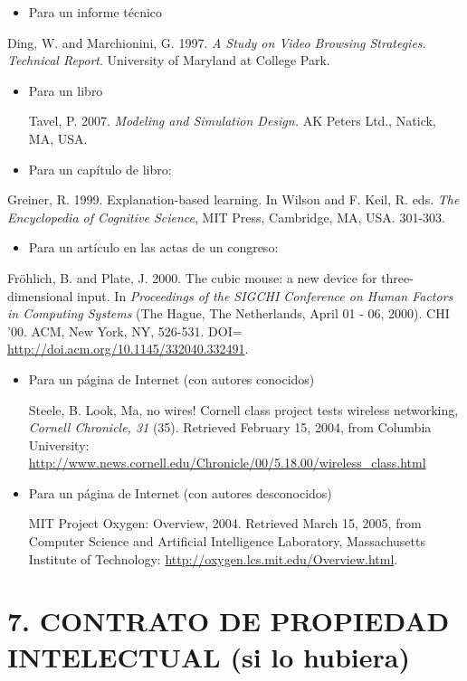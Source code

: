 \documentclass[a4paper]{article}
\newcommand\liststyleLii{%
\renewcommand\labelitemi{{\textbullet}}
\renewcommand\labelitemii{${\circ}$}
\renewcommand\labelitemiii{${\blacksquare}$}
\renewcommand\labelitemiv{{\textbullet}}
}
\newcommand\liststyleLiii{%
\renewcommand\labelitemi{{\textbullet}}
\renewcommand\labelitemii{${\circ}$}
\renewcommand\labelitemiii{${\blacksquare}$}
\renewcommand\labelitemiv{{\textbullet}}
}
\newcommand\liststyleLiv{%
\renewcommand\labelitemi{{\textbullet}}
\renewcommand\labelitemii{${\circ}$}
\renewcommand\labelitemiii{${\blacksquare}$}
\renewcommand\labelitemiv{{\textbullet}}
}
\newcommand\liststyleLv{%
\renewcommand\labelitemi{{\textbullet}}
\renewcommand\labelitemii{${\circ}$}
\renewcommand\labelitemiii{${\blacksquare}$}
\renewcommand\labelitemiv{{\textbullet}}
}
\newcommand\liststyleLvi{%
\renewcommand\labelitemi{{\textbullet}}
\renewcommand\labelitemii{${\circ}$}
\renewcommand\labelitemiii{${\blacksquare}$}
\renewcommand\labelitemiv{{\textbullet}}
}
\begin{document}
\liststyleLii
\begin{itemize}
\item Para un informe t\'ecnico
\end{itemize}
Ding, W. and Marchionini, G. 1997. \textit{A Study on Video Browsing Strategies. Technical Report}. University of
Maryland at College Park.

\liststyleLiii
\begin{itemize}
\item Para un libro

Tavel, P. 2007. \textit{Modeling and Simulation Design.} AK Peters Ltd., Natick, MA, USA.
\end{itemize}
\liststyleLiv
\begin{itemize}
\item Para un cap\'itulo de libro:
\end{itemize}
Greiner, R. 1999. Explanation-based learning. In Wilson and F. Keil, R. eds. \textit{The Encyclopedia of Cognitive
Science}, MIT Press, Cambridge, MA, USA. 301-303.

\liststyleLv
\begin{itemize}
\item Para un art\'iculo en las actas de un congreso:
\end{itemize}
Fr\"ohlich, B. and Plate, J. 2000. The cubic mouse: a new device for three-dimensional input. In \textit{Proceedings of
the SIGCHI Conference on Human Factors in Computing Systems} (The Hague, The Netherlands, April 01 - 06, 2000). CHI
'00. ACM, New York, NY, 526-531. DOI= \url{http://doi.acm.org/10.1145/332040.332491}.

\liststyleLvi
\begin{itemize}
\item Para un p\'agina de Internet (con autores conocidos)

Steele, B. Look, Ma, no wires! Cornell class project tests wireless networking, \textit{Cornell Chronicle, 31 }(35).
Retrieved February 15, 2004, from Columbia University:
\url{http://www.news.cornell.edu/Chronicle/00/5.18.00/wireless_class.html}
\item Para un p\'agina de Internet (con autores desconocidos)

MIT Project Oxygen: Overview, 2004. Retrieved March 15, 2005, from Computer Science and Artificial Intelligence
Laboratory, Massachusetts Institute of Technology: \url{http://oxygen.lcs.mit.edu/Overview.html}. \
\end{itemize}

\bigskip

\section{7. CONTRATO DE PROPIEDAD INTELECTUAL (si lo hubiera)}

\bigskip

\clearpage\clearpage\pagestyle{plain}
\thispagestyle{FirstPage}


\bigskip
\end{document}
